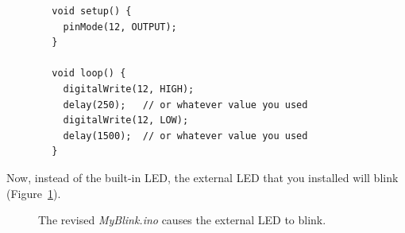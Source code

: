 
\begin{description}
        \begin{lstlisting}
        void setup() {
          pinMode(12, OUTPUT);
        }

        void loop() {
          digitalWrite(12, HIGH);
          delay(250);   // or whatever value you used
          digitalWrite(12, LOW);
          delay(1500);  // or whatever value you used
        }
        \end{lstlisting}
\end{description}
Now, instead of the built-in LED, the external LED that you installed will blink (Figure~\ref{fig:revisedblink}).

\begin{figure}
    \centering
    \caption{The revised \textit{MyBlink.ino} causes the external LED to blink.\label{fig:revisedblink}}
\end{figure}

